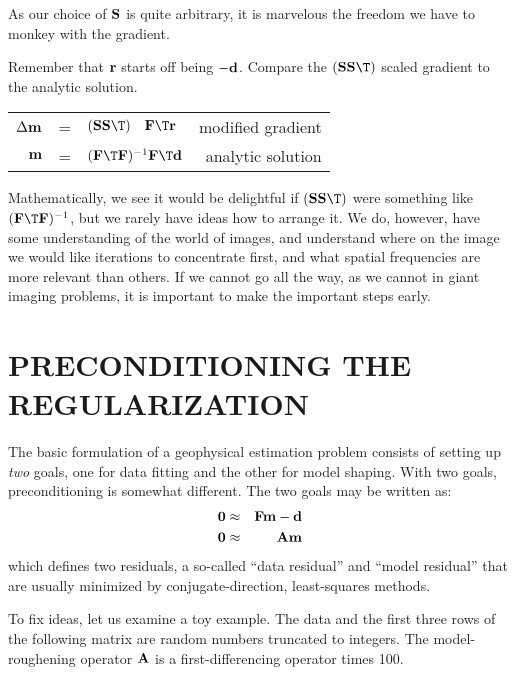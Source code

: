 As our choice of $\bold S$ is quite arbitrary,
it is marvelous the freedom we have to monkey with the gradient.
\par
Remember that $\bold r$ starts off being $-\bold d$.
Compare the $(\bold S\bold S\T)$ scaled gradient to the analytic solution.
\par
\begin{center}
\begin{tabular}{rllr}
$\Delta\bold m $&=&$ (\bold S\bold S\T)\ \ \  \bold F\T\bold r	$& modified gradient
\\
$\bold m $&=&$ (\bold F\T\bold F)^{-1} \bold F\T\bold d		$& analytic solution
\end{tabular}
\end{center}
Mathematically,
we see it would be delightful if
$ (\bold S\bold S\T)$ were something like $(\bold F\T\bold F)^{-1}$,
but we rarely have ideas how to arrange it.
We do,
however, have some understanding of the world of images,
and understand where on the image we would like iterations to concentrate first,
and what spatial frequencies are more relevant than others.
If we cannot go all the way, as we cannot in giant imaging problems,
it is important to make the important steps early.


\section{PRECONDITIONING THE REGULARIZATION}


\par
The basic formulation of a geophysical estimation problem
consists of setting up
{\em  two}
goals,
one for data fitting
and the other for model shaping.
With two goals, preconditioning is somewhat different.
The two goals may be written as:
\begin{eqnarray}
\bold 0 &\approx& \bold F \bold m - \bold d \\
\bold 0 &\approx& \bold A \bold m
\end{eqnarray}
which defines two residuals,
a so-called ``data residual'' and ``model residual'' that
are usually minimized by conjugate-direction, least-squares methods.
\par
To fix ideas, let us examine a toy example.
The data and the first three rows of the following matrix 
are random numbers truncated to integers.
The model-roughening operator $\bold A$
is a first-differencing operator times 100.

